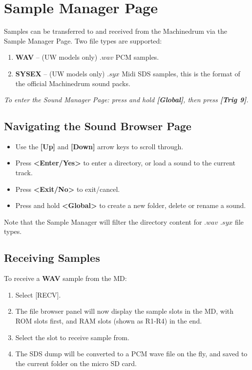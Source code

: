 \chapter{Sample Manager Page}
Samples can be transferred to and received from the Machinedrum via the Sample Manager Page. Two file types are supported: 
\begin{enumerate}
    \item \textbf{WAV} -- (UW models only) $.wav$ PCM samples.
    \item \textbf{SYSEX} -- (UW models only) $.syx$ Midi SDS samples, this is the format of the official Machinedrum sound packs.
\end{enumerate}

\textit{To enter the Sound Manager Page: press and hold \textbf{[Global]}, then press \textbf{[Trig 9]}.}

\section{Navigating the Sound Browser Page}


\begin{itemize}
    \item Use the \textbf{[Up]} and \textbf{[Down]} arrow keys to scroll through.
    \item Press \textbf{<Enter/Yes>} to enter a directory, or load a sound to the current track.
    \item Press \textbf{<Exit/No>} to exit/cancel.
    \item Press and hold \textbf{<Global>} to create a new folder, delete or rename a sound.
\end{itemize}

Note that the Sample Manager will filter the directory content for $.wav$ $.syx$ file types.
\newpage
\section{Receiving Samples}
To receive a \textbf{WAV} sample from the MD:
\begin{enumerate}
    \item Select [RECV].
    \item The file browser panel will now display the sample slots in the MD, with ROM slots first, and RAM slots (shown as R1-R4) in the end.
    \item Select the slot to receive sample from.
    \item The SDS dump will be converted to a PCM wave file on the fly, and saved to the current folder on the micro SD card.
\end{enumerate}

